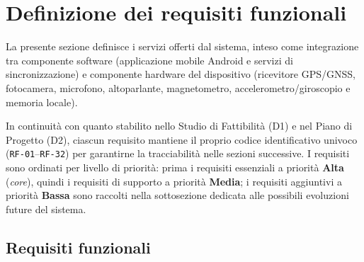 \section{Definizione dei requisiti funzionali}

La presente sezione definisce i servizi offerti dal sistema, inteso come integrazione tra componente software (applicazione mobile Android e servizi di sincronizzazione) e componente hardware del dispositivo (ricevitore GPS/GNSS, fotocamera, microfono, altoparlante, magnetometro, accelerometro/giroscopio e memoria locale).

In continuità con quanto stabilito nello Studio di Fattibilità (D1) e nel Piano di Progetto (D2), ciascun requisito mantiene il proprio codice identificativo univoco (\texttt{RF-01}--\texttt{RF-32}) per garantirne la tracciabilità nelle sezioni successive. I requisiti sono ordinati per livello di priorità: prima i requisiti essenziali a priorità \textbf{Alta} (\emph{core}), quindi i requisiti di supporto a priorità \textbf{Media}; i requisiti aggiuntivi a priorità \textbf{Bassa} sono raccolti nella sottosezione dedicata alle possibili evoluzioni future del sistema.

\subsection{Requisiti funzionali}

